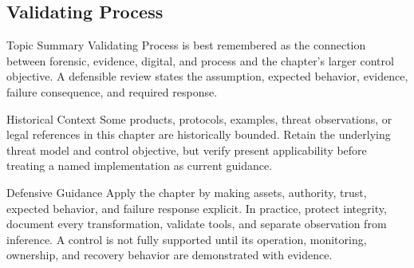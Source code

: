 \documentclass[11pt,letterpaper]{article}
\begin{document}
\subsection*{Validating Process}
\begin{CornellNotesTable}
\end{CornellNotesTable}
\begin{CornellSummaryBox}{Topic Summary}
Validating Process is best remembered as the connection between forensic, evidence, digital, and process and the chapter's larger control objective. A defensible review states the assumption, expected behavior, evidence, failure consequence, and required response.
\end{CornellSummaryBox}
\begin{CornellWarningBox}{Historical Context}
Some products, protocols, examples, threat observations, or legal references in this chapter are historically bounded. Retain the underlying threat model and control objective, but verify present applicability before treating a named implementation as current guidance.
\end{CornellWarningBox}
\begin{CornellOverviewBox}{Defensive Guidance}
Apply the chapter by making assets, authority, trust, expected behavior, and failure response explicit. In practice, protect integrity, document every transformation, validate tools, and separate observation from inference. A control is not fully supported until its operation, monitoring, ownership, and recovery behavior are demonstrated with evidence.
\end{CornellOverviewBox}
\end{document}
